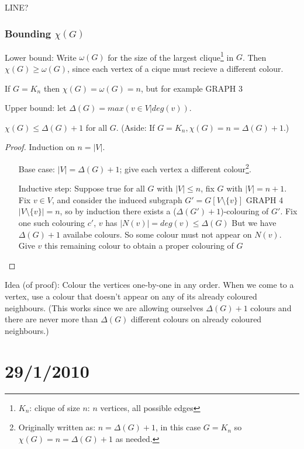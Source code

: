 \documentclass{article}
\begin{document}
LINE?

\subsubsection*{Bounding $\chi(G)$}
Lower bound: Write $\omega(G)$ for the size of the largest clique\footnote{$K_n$: clique of size $n$: $n$ vertices, all possible edges} in $G$.  Then $\chi(G) \geq \omega(G)$, since each vertex of a cique must recieve a different colour.

If $G=K_n$ then $\chi(G) = \omega(G)=n$, but for example GRAPH 3 

Upper bound: let $\Delta(G)=max(v\in V | deg(v))$.
\begin{prop}
$\chi(G) \leq \Delta(G)+1$ for all $G$. (Aside: If $G = K_n, \chi(G) = n =\Delta(G)+1$.)
\end{prop}



\begin{proof}


Induction on $n = |V|$.
\begin{enumerate}
 \item[Base case:] $|V|=\Delta(G)+1$; give each vertex a different colour\footnote{Originally written as: $n = \Delta(G)+1$, in this case $G= K_n$ so $\chi(G) = n = \Delta(G)+1$ as needed.}.
\item[Inductive step:] Suppose true for all $G$ with $|V|\leq n$, fix $G$ with $|V|=n+1$.  Fix $v\in V$, and consider the induced subgraph $G' = G[V \setminus \{v\}]$ GRAPH 4	$|V\setminus \{v\}| = n$, so by induction there exists a ($\Delta(G')+1$)-colouring of $G'$.  Fix one such colouring $c'$, $v$ has $|N(v)| = deg(v) \leq \Delta(G)$ But we have $\Delta(G)+1$ availabe colours.  So some colour must not appear on $N(v)$.  Give $v$ this remaining colour to obtain a proper colouring of $G$
\end{enumerate}
\end{proof}

Idea (of proof): Colour the vertices one-by-one in any order.  When we come to a vertex, use a colour that doesn't appear on any of its already coloured neighbours. (This works since we are allowing ourselves $\Delta(G) +1$ colours and there are never more than $\Delta(G)$ different colours on already coloured neighbours.)

\section*{29/1/2010}
\end{document}
